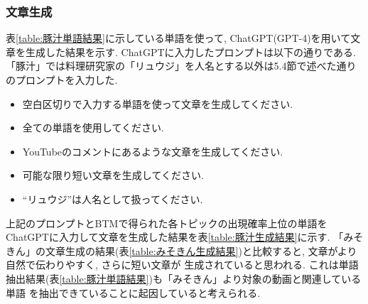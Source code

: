 \documentclass{ltjarticle}
\begin{document}
\subsubsection{文章生成}
表\ref{table:豚汁単語結果}に示している単語を使って, ChatGPT(GPT-4)を用いて文章を生成した結果を示す. 
ChatGPTに入力したプロンプトは以下の通りである.  「豚汁」では料理研究家の「リュウジ」を人名とする以外は5.4節で述べた通りのプロンプトを入力した. 
\begin{itemize}
    \item 空白区切りで入力する単語を使って文章を生成してください.
    \item 全ての単語を使用してください.
    \item YouTubeのコメントにあるような文章を生成してください.
    \item 可能な限り短い文章を生成してください.
    \item ``リュウジ''は人名として扱ってください.
\end{itemize}
\vspace{10truept}

上記のプロンプトとBTMで得られた各トピックの出現確率上位の単語をChatGPTに入力して文章を生成した結果を表\ref{table:豚汁生成結果}に示す. 
「みそきん」の文章生成の結果(表\ref{table:みそきん生成結果})と比較すると, 文章がより自然で伝わりやすく, さらに短い文章が
生成されていると思われる. これは単語抽出結果(表\ref{table:豚汁単語結果})も「みそきん」より対象の動画と関連している単語
を抽出できていることに起因していると考えられる. 
\vspace{5truept}
\end{document}
